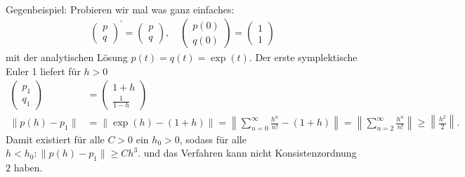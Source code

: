 \begin{solution}
\begin{align*}
\end{align*}
Gegenbeispiel: Probieren wir mal was ganz einfaches:
\begin{align*}
  \begin{pmatrix}
    p \\ q
  \end{pmatrix}^{\prime}
  = \begin{pmatrix}
    p \\ q
  \end{pmatrix}, \quad
  \begin{pmatrix}
    p(0) \\ q(0)
  \end{pmatrix} =
  \begin{pmatrix}
    1 \\ 1
  \end{pmatrix}
\end{align*}
mit der analytischen Lösung $p(t) = q(t) = \exp(t)$.
Der erste symplektische Euler 1 liefert für $h > 0$
\begin{align*}
  \begin{pmatrix}
    p_1 \\ q_1
  \end{pmatrix}
  &= \begin{pmatrix}
    1+h \\ \frac{1}{1-h}
  \end{pmatrix} \\
  \|p(h) - p_1\| &= \|\exp(h) - (1+h)\| = \left\|\sum_{n = 0}^{\infty}\frac{h^n}{n!} - (1+h)\right\|
  = \left\|\sum_{n = 2}^{\infty}\frac{h^n}{n!}\right\| \geq \left\|\frac{h^2}{2}\right\|.
\end{align*}
Damit existiert für alle $C > 0$ ein $h_0 > 0$, sodass für alle $h < h_0: \|p(h)-p_1\| \geq Ch^3$.
und das Verfahren kann nicht Konsistenzordnung $2$ haben.
\end{solution}
